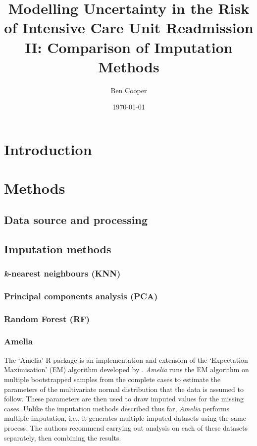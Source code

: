 \documentclass[onecolumn]{article}
\title{Modelling Uncertainty in the Risk of Intensive Care Unit Readmission II: Comparison of Imputation Methods}
\date{\today}
\author{Ben Cooper}
\begin{document}
\maketitle

\section{Introduction}


\section{Methods}

\subsection{Data source and processing}


\subsection{Imputation methods}


\subsubsection{\textit{k}-nearest neighbours (KNN)}

\subsubsection{Principal components analysis (PCA)}

\subsubsection{Random Forest (RF)}

\subsubsection{Amelia}

The `Amelia' R package \citep{Honaker2011} is an implementation and extension of the `Expectation Maximisation' (EM) algorithm developed by \cite{Dempster1977}. \textit{Amelia} runs the EM algorithm on multiple bootstrapped samples from the complete cases to estimate the parameters of the multivariate normal distribution that the data is assumed to follow. These parameters are then used to draw imputed values for the missing cases. Unlike the imputation methods described thus far, \textit{Amelia} performs multiple imputation, i.e., it generates multiple imputed datasets using the same process. The authors recommend carrying out analysis on each of these datasets separately, then combining the results.
\end{document}
